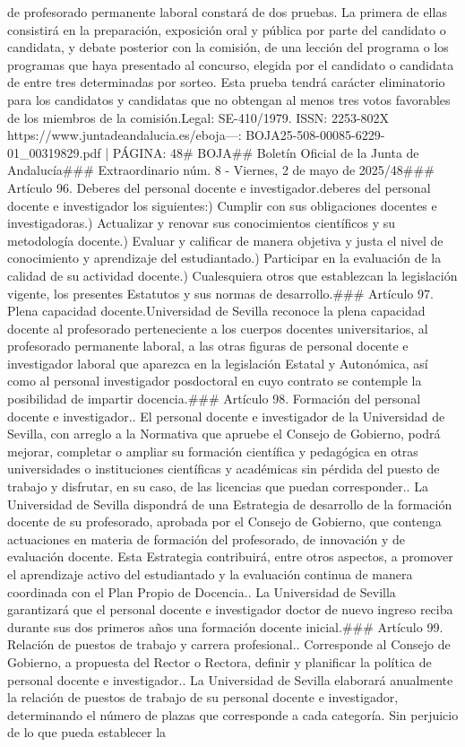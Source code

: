 \documentclass{article}
\begin{document}
\begin{itemize}
{{de profesorado permanente laboral constará de dos pruebas. La primera de ellas consistirá en la preparación, exposición oral y pública por parte del candidato o candidata, y debate posterior con la comisión, de una lección del programa o los programas que haya presentado al concurso, elegida por el candidato o candidata de entre tres determinadas por sorteo. Esta prueba tendrá carácter eliminatorio para los candidatos y candidatas que no obtengan al menos tres votos favorables de los miembros de la comisión.\n{} Legal: SE-410/1979. ISSN: 2253-802X https://www.juntadeandalucia.es/eboja\n{}\n\n---\n\nFUENTE: BOJA25-508-00085-6229-01_00319829.pdf | PÁGINA: 48\n# BOJA\n## Boletín Oficial de la Junta de Andalucía\n### Extraordinario núm. 8 - Viernes, 2 de mayo de 2025/48\n\n### Artículo 96. Deberes del personal docente e investigador.\nSon deberes del personal docente e investigador los siguientes:\na) Cumplir con sus obligaciones docentes e investigadoras.\nb) Actualizar y renovar sus conocimientos científicos y su metodología docente.\nc) Evaluar y calificar de manera objetiva y justa el nivel de conocimiento y aprendizaje del estudiantado.\nd) Participar en la evaluación de la calidad de su actividad docente.\ne) Cualesquiera otros que establezcan la legislación vigente, los presentes Estatutos y sus normas de desarrollo.\n\n### Artículo 97. Plena capacidad docente.\nLa Universidad de Sevilla reconoce la plena capacidad docente al profesorado perteneciente a los cuerpos docentes universitarios, al profesorado permanente laboral, a las otras figuras de personal docente e investigador laboral que aparezca en la legislación Estatal y Autonómica, así como al personal investigador posdoctoral en cuyo contrato se contemple la posibilidad de impartir docencia.\n\n### Artículo 98. Formación del personal docente e investigador.. El personal docente e investigador de la Universidad de Sevilla, con arreglo a la Normativa que apruebe el Consejo de Gobierno, podrá mejorar, completar o ampliar su formación científica y pedagógica en otras universidades o instituciones científicas y académicas sin pérdida del puesto de trabajo y disfrutar, en su caso, de las licencias que puedan corresponder.. La Universidad de Sevilla dispondrá de una Estrategia de desarrollo de la formación docente de su profesorado, aprobada por el Consejo de Gobierno, que contenga actuaciones en materia de formación del profesorado, de innovación y de evaluación docente. Esta Estrategia contribuirá, entre otros aspectos, a promover el aprendizaje activo del estudiantado y la evaluación continua de manera coordinada con el Plan Propio de Docencia.. La Universidad de Sevilla garantizará que el personal docente e investigador doctor de nuevo ingreso reciba durante sus dos primeros años una formación docente inicial.\n\n### Artículo 99. Relación de puestos de trabajo y carrera profesional.. Corresponde al Consejo de Gobierno, a propuesta del Rector o Rectora, definir y planificar la política de personal docente e investigador.. La Universidad de Sevilla elaborará anualmente la relación de puestos de trabajo de su personal docente e investigador, determinando el número de plazas que corresponde a cada categoría. Sin perjuicio de lo que pueda establecer la }}
\end{itemize}
\end{document}
